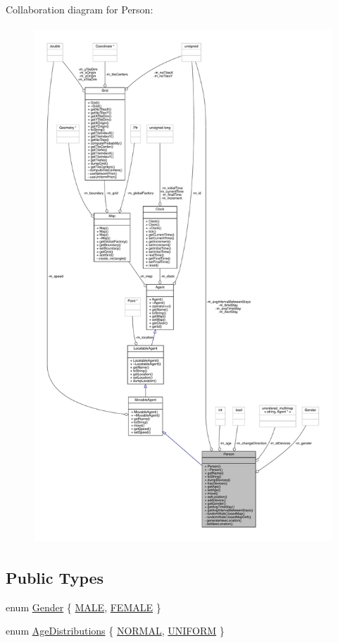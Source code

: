 Collaboration diagram for Person\+:
\nopagebreak
\begin{figure}[H]
\begin{center}
\leavevmode
\includegraphics[height=550pt]{class_person__coll__graph}
\end{center}
\end{figure}
\subsection*{Public Types}
\begin{DoxyCompactItemize}
\item 
enum \mbox{\hyperlink{class_person_aff84ca16bd4dbf364614d86f20b29dd2}{Gender}} \{ \mbox{\hyperlink{class_person_aff84ca16bd4dbf364614d86f20b29dd2a16691f7cc6595f87b71d9b43ad23fcb4}{M\+A\+LE}}, 
\mbox{\hyperlink{class_person_aff84ca16bd4dbf364614d86f20b29dd2a8ee21010fb2d8e8794ef72be368da064}{F\+E\+M\+A\+LE}}
 \}
\item 
enum \mbox{\hyperlink{class_person_a53376a9a5852ec7760488a01c37f0b0b}{Age\+Distributions}} \{ \mbox{\hyperlink{class_person_a53376a9a5852ec7760488a01c37f0b0ba7e4e1da74c9858476e0149deef9458c4}{N\+O\+R\+M\+AL}}, 
\mbox{\hyperlink{class_person_a53376a9a5852ec7760488a01c37f0b0ba4cf35976a167c4ac001a3eed2920a9b0}{U\+N\+I\+F\+O\+RM}}
 \}
\end{DoxyCompactItemize}
